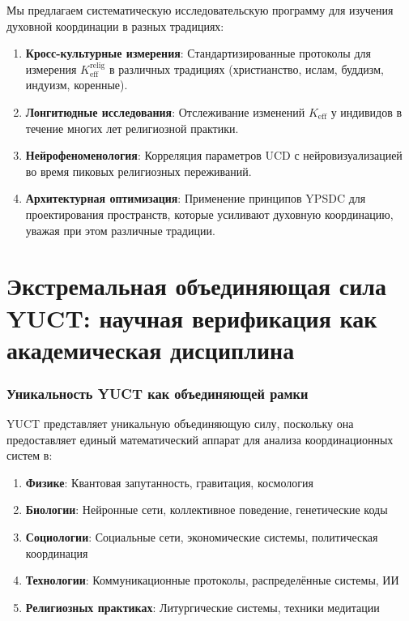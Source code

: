 \documentclass[12pt,a4paper]{article}
\begin{document}
	Мы предлагаем систематическую исследовательскую программу для изучения духовной координации в разных традициях:
	
	\begin{enumerate}
		\item \textbf{Кросс-культурные измерения}: Стандартизированные протоколы для измерения $K_{\mathrm{eff}}^{\mathrm{relig}}$ в различных традициях (христианство, ислам, буддизм, индуизм, коренные).
		
		\item \textbf{Лонгитюдные исследования}: Отслеживание изменений $K_{\mathrm{eff}}$ у индивидов в течение многих лет религиозной практики.
		
		\item \textbf{Нейрофеноменология}: Корреляция параметров UCD с нейровизуализацией во время пиковых религиозных переживаний.
		
		\item \textbf{Архитектурная оптимизация}: Применение принципов YPSDC для проектирования пространств, которые усиливают духовную координацию, уважая при этом различные традиции.
	\end{enumerate}
	
	\newpage
	\part{Экстремальная объединяющая сила YUCT: научная верификация как академическая дисциплина}
	
	\section{Уникальность YUCT как объединяющей рамки}
	
	YUCT представляет уникальную объединяющую силу, поскольку она предоставляет единый математический аппарат для анализа координационных систем в:
	
	\begin{enumerate}
		\item \textbf{Физике}: Квантовая запутанность, гравитация, космология
		\item \textbf{Биологии}: Нейронные сети, коллективное поведение, генетические коды
		\item \textbf{Социологии}: Социальные сети, экономические системы, политическая координация
		\item \textbf{Технологии}: Коммуникационные протоколы, распределённые системы, ИИ
		\item \textbf{Религиозных практиках}: Литургические системы, техники медитации
	\end{enumerate}
	
\end{document}
